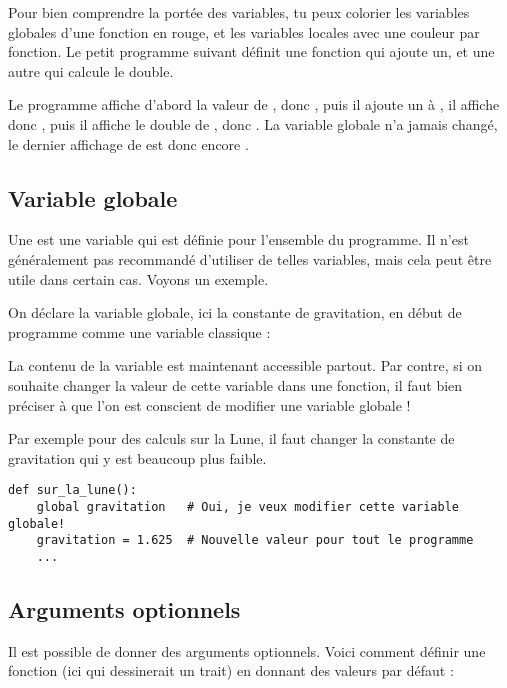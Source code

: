 \documentclass[11pt,class=report,crop=false]{standalone}
\begin{document}
Pour bien comprendre la portée des variables, tu peux colorier les variables globales d'une fonction en rouge, et les variables locales avec une couleur par fonction.
Le petit programme suivant définit une fonction qui ajoute un, et une autre qui calcule le double.


Le programme affiche d'abord la valeur de , donc , puis il ajoute un à , il affiche donc , puis il affiche le double de , donc . La variable globale  n'a jamais changé, le dernier affichage de  est donc encore .

\subsection{Variable globale}

Une  est une variable qui est définie pour l'ensemble du programme. Il n'est généralement pas recommandé d'utiliser de telles variables, mais cela peut être utile dans certain cas. Voyons un exemple.

On déclare la variable globale, ici la constante de gravitation, en début de programme comme une variable classique :

La contenu de la variable  est maintenant accessible partout.
Par contre, si on souhaite changer la valeur de cette variable dans une fonction, il faut bien préciser à \Python{} que l'on est conscient de modifier une variable globale !

Par exemple pour des calculs sur la Lune, il faut changer la constante de gravitation qui y est beaucoup plus faible.

\begin{lstlisting}
def sur_la_lune():
    global gravitation   # Oui, je veux modifier cette variable globale!
    gravitation = 1.625  # Nouvelle valeur pour tout le programme    
    ...
\end{lstlisting}


\subsection{Arguments optionnels}


Il est possible de donner des arguments optionnels. Voici comment définir une fonction (ici qui dessinerait un trait) en donnant des valeurs par défaut :
 
\end{document}
